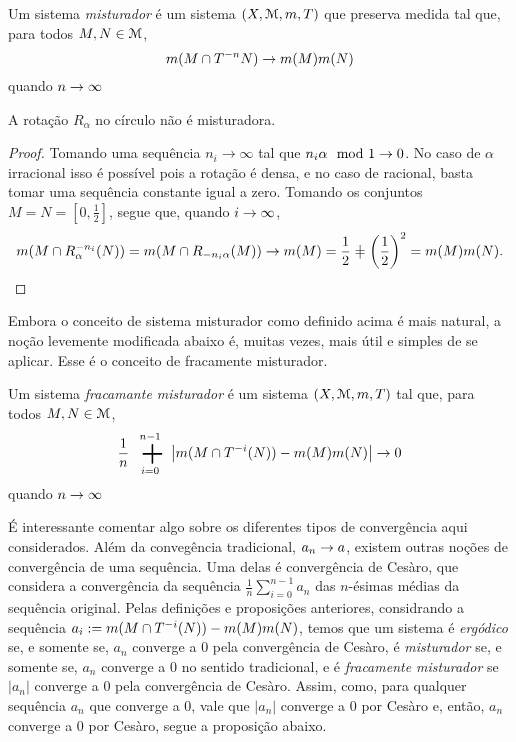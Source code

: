 \begin{definition}
	Um sistema \emph{misturador} é um sistema $(X,\mathcal{M},m,T)$ que preserva medida tal que, para todos $M,N \in \mathcal{M}$,
	\begin{equation*}
	m(M \cap T^{-n} N) \rightarrow m(M)m(N)
	\end{equation*}
quando $n \rightarrow \infty$
\end{definition}

\begin{proposition}
	A rotação $R_\alpha$ no círculo não é misturadora.
\end{proposition}
\begin{proof}
	Tomando uma sequência $n_i \to \infty$ tal que $n_i\alpha \mod 1 \rightarrow 0$. No caso de $\alpha$ irracional isso é possível pois a rotação é densa, e no caso de racional, basta tomar uma sequência constante igual a zero. Tomando os conjuntos $M=N=[0,\frac{1}{2}]$, segue que, quando $i \rightarrow \infty$,
	\begin{equation*}
	\med(M \cap R_\alpha^{-n_i}(N))=\med(M \cap R_{-n_i\alpha}(M)) \conv \med(M)=\frac{1}{2}\neq \left(\frac{1}{2}\right)^2=\med(M)\med(N).
	\end{equation*}
\end{proof}

	Embora o conceito de sistema misturador como definido acima é mais natural, a noção levemente modificada abaixo é, muitas vezes, mais útil e simples de se aplicar. Esse é o conceito de fracamente misturador.

\begin{definition}
	Um sistema \emph{fracamante misturador} é um sistema $(X,\mathcal{M},m,T)$ tal que, para todos $M,N \in \mathcal{M}$,
	\begin{equation*}
	\frac{1}{n} \sum_{i=0}^{n-1} \left|\med(M \cap T^{-i}(N)) - \med(M)\med(N)\right| \conv 0
	\end{equation*}
quando $n \rightarrow \infty$
\end{definition}

	É interessante comentar algo sobre os diferentes tipos de convergência aqui considerados. Além da convegência tradicional, $a_n \rightarrow a$, existem outras noções de convergência de uma sequência. Uma delas é convergência de Cesàro, que considera a convergência da sequência $\frac{1}{n} \sum_{i=0}^{n-1} a_n$ das $n$-ésimas médias da sequência original. Pelas definições e proposições anteriores, considrando a sequência $a_i := m(M \cap T^{-i}(N)) - m(M)m(N)$, temos que um sistema é \emph{ergódico} se, e somente se, $a_n$ converge a $0$ pela convergência de Cesàro, é \emph{misturador} se, e somente se, $a_n$ converge a $0$ no sentido tradicional, e é \emph{fracamente misturador} se $|a_n|$ converge a $0$ pela convergência de Cesàro. Assim, como, para qualquer sequência $a_n$ que converge a $0$, vale que $|a_n|$ converge a $0$ por Cesàro e, então, $a_n$ converge a $0$ por Cesàro, segue a proposição abaixo.

